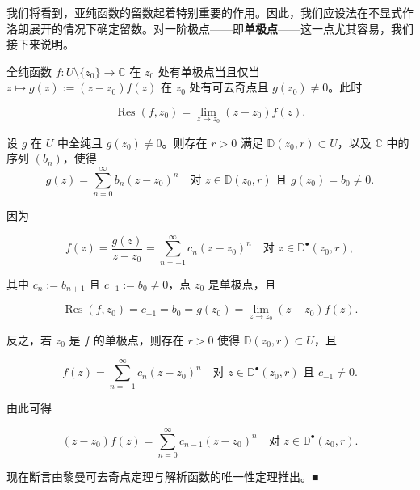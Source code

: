 我们将看到，亚纯函数的留数起着特别重要的作用。因此，我们应设法在不显式作洛朗展开的情况下确定留数。对一阶极点——即\textbf{单极点}——这一点尤其容易，我们接下来说明。

\begin{proposition}

全纯函数 $ f : U\setminus\{z_{0}\} \to \mathbb{C} $ 在 $ z_{0} $ 处有单极点当且仅当 $ z \mapsto g(z) := (z - z_{0})f(z) $ 在 $ z_{0} $ 处有可去奇点且 $ g(z_{0}) \ne 0 $。此时

\[
\operatorname{Res}(f,z_{0}) = \lim_{z\to z_{0}}(z - z_{0})f(z) .
\]

\proofhead
设 $ g $ 在 $ U $ 中全纯且 $ g(z_{0}) \ne 0 $。则存在 $ r > 0 $ 满足 $ \mathbb{D}(z_{0},r) \subset U $，以及 $ \mathbb{C} $ 中的序列 $ (b_{n}) $，使得
\[
g(z) = \sum_{n=0}^{\infty}b_{n}(z - z_{0})^{n} \quad \text{对 } z \in \mathbb{D}(z_{0},r) \text{ 且 } g(z_{0}) = b_{0} \ne 0 .
\]

因为

\[
f(z) = \frac{g(z)}{z - z_{0}} = \sum_{n=-1}^{\infty}c_{n}(z - z_{0})^{n} \quad \text{对 } z \in \mathbb{D}^{\bullet}(z_{0},r) ,
\]

其中 $ c_{n} := b_{n+1} $ 且 $ c_{-1} := b_{0} \ne 0 $，点 $ z_{0} $ 是单极点，且

\[
\operatorname{Res}(f,z_{0}) = c_{-1} = b_{0} = g(z_{0}) = \lim_{z\to z_{0}}(z - z_{0})f(z) .
\]

反之，若 $ z_{0} $ 是 $ f $ 的单极点，则存在 $ r > 0 $ 使得 $ \mathbb{D}(z_{0},r) \subset U $，且

\[
f(z) = \sum_{n=-1}^{\infty}c_{n}(z - z_{0})^{n} \quad \text{对 } z \in \mathbb{D}^{\bullet}(z_{0},r) \text{ 且 } c_{-1} \ne 0 .
\]

由此可得

\[
(z - z_{0})f(z) = \sum_{n=0}^{\infty}c_{n-1}(z - z_{0})^{n} \quad \text{对 } z \in \mathbb{D}^{\bullet}(z_{0},r) .
\]

现在断言由黎曼可去奇点定理与解析函数的唯一性定理推出。\nobreak\hspace{0.35em}■

\end{proposition}

